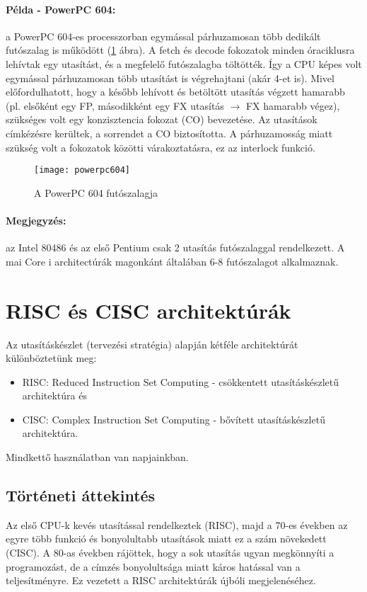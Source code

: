 \paragraph{Példa - PowerPC 604:} a PowerPC 604-es processzorban egymással párhuzamosan több dedikált futószalag is működött (\ref{fig:powerpc604} ábra).
A fetch és decode fokozatok minden óraciklusra lehívtak egy utasítást, és a megfelelő futószalagba töltötték.
Így a CPU képes volt egymással párhuzamosan több utasítást is végrehajtani (akár 4-et is).
Mivel előfordulhatott, hogy a később lehívott és betöltött utasítás végzett hamarabb (pl. elsőként egy FP, másodikként egy FX utasítás $\rightarrow$ FX hamarabb végez), szükséges volt egy konzisztencia fokozat (CO) bevezetése.
Az utasítások címkézésre kerültek, a sorrendet a CO biztosította.
A párhuzamosság miatt szükség volt a fokozatok közötti várakoztatásra, ez az interlock funkció.
\label{powerpc604}
\begin{figure}[h]
    \texttt{[image: powerpc604]}
    \centering
    \caption{A PowerPC 604 futószalagja}
    \label{fig:powerpc604}
\end{figure}
\paragraph{Megjegyzés:} az Intel 80486 és az első Pentium csak 2 utasítás futószalaggal rendelkezett. A mai Core i architectúrák magonkánt általában 6-8 futószalagot alkalmaznak.

\section{RISC és CISC architektúrák}
Az utasításkészlet (tervezési stratégia) alapján kétféle architektúrát különböztetünk meg:
\begin{itemize}
    \item RISC: Reduced Instruction Set Computing - csökkentett utasításkészletű architektúra és
    \item CISC: Complex Instruction Set Computing - bővített utasításkészletű architektúra.
\end{itemize}
Mindkettő használatban van napjainkban.
\subsection{Történeti áttekintés}
Az első CPU-k kevés utasítással rendelkeztek (RISC), majd a 70-es években az egyre több funkció és bonyolultabb utasítások miatt ez a szám növekedett (CISC).
A 80-as években rájöttek, hogy a sok utasítás ugyan megkönnyíti a programozást, de a címzés bonyolultsága miatt káros hatással van a teljesítményre.
Ez vezetett a RISC architektúrák újbóli megjelenéséhez.
